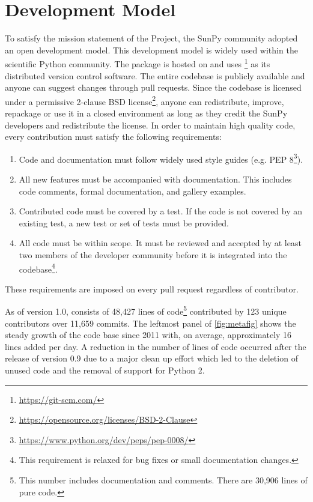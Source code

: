 \section{Development Model}
\label{sec:development}

To satisfy the mission statement of the Project, the SunPy community adopted an open development model.
This development model is widely used within the scientific Python community.
The \sunpypkg package is hosted on \github and uses \footnote{\url{https://git-scm.com/}} as its distributed version control software.
The entire codebase is publicly available and anyone can suggest changes through pull requests.
Since the codebase is licensed under a permissive 2-clause BSD license\footnote{\url{https://opensource.org/licenses/BSD-2-Clause}}, anyone can redistribute, improve, repackage or use it in a closed environment as long as they credit the SunPy developers and redistribute the license.
In order to maintain high quality code, every contribution must satisfy the following requirements:
\begin{enumerate}
    \item Code and documentation must follow widely used style guides (e.g. PEP 8\footnote{\url{https://www.python.org/dev/peps/pep-0008/}}).
    \item All new features must be accompanied with documentation.
    This includes code comments, formal documentation, and gallery examples.
    \item Contributed code must be covered by a test. If the code is not covered by an existing test, a new test or set of tests must be provided.
    \item All code must be within scope. It must be reviewed and accepted by at least two members of the developer community before it is integrated into the codebase\footnote{This requirement is relaxed for bug fixes or small documentation changes.}.
\end{enumerate}
These requirements are imposed on every pull request regardless of contributor.

As of version 1.0, \sunpypkg consists of 48,427 lines of code\footnote{This number includes documentation and comments.
There are 30,906 lines of pure code.} contributed by 123 unique contributors over 11,659 \git commits.
The leftmost panel of \autoref{fig:metafig} shows the steady growth of the code base since 2011 with, on average, approximately 16 lines added per day.
A reduction in the number of lines of code occurred after the release of version 0.9 due to a major clean up effort which led to the deletion of unused code and the removal of support for Python 2.

